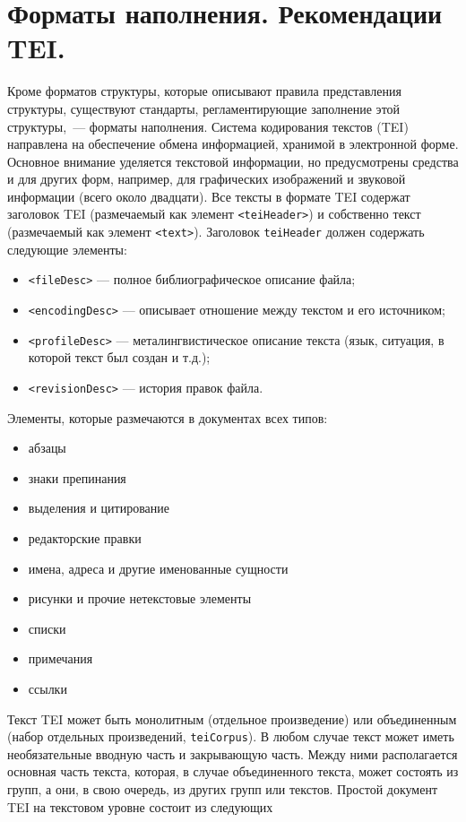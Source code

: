 \documentclass[12pt]{article}
\theoremstyle{definition}
\theoremstyle{remark}
\numberwithin{equation}{section}
\begin{document}
\section{Форматы наполнения. Рекомендации TEI.}
Кроме форматов структуры, которые описывают правила представления структуры, существуют стандарты, регламентирующие заполнение этой структуры,~--- форматы наполнения.
Система кодирования текстов (TEI) направлена на обеспечение обмена информацией, хранимой
в электронной форме. Основное внимание уделяется текстовой информации, но предусмотрены средства и для других форм, например, для графических изображений и звуковой информации (всего около двадцати). Все тексты в формате TEI содержат заголовок TEI (размечаемый как элемент \texttt{<teiHeader>}) и собственно текст (размечаемый как элемент \texttt{<text>}). Заголовок \texttt{teiHeader} должен содержать следующие элементы:
\begin{itemize}
\item \texttt{<fileDesc>} --- полное библиографическое описание файла;
\item \texttt{<encodingDesc>} --- описывает отношение между текстом и его источником;
\item \texttt{<profileDesc>} --- металингвистическое описание текста (язык, ситуация, в которой текст был создан и т.д.);
\item \texttt{<revisionDesc>} --- история правок файла.
\end{itemize}
Элементы, которые размечаются в документах всех типов:
\begin{itemize}
\item абзацы
\item знаки препинания
\item выделения и цитирование
\item редакторские правки
\item имена, адреса и другие именованные сущности
\item рисунки и прочие нетекстовые элементы
\item списки
\item примечания
\item ссылки
\end{itemize}
Текст TEI может быть монолитным (отдельное произведение) или объединенным (набор
отдельных произведений, \texttt{teiCorpus}). В любом случае текст может иметь
необязательные вводную часть и закрывающую часть. Между ними располагается основная часть
текста, которая, в случае объединенного текста, может состоять из групп, а они, в свою очередь, из других групп или текстов. Простой документ TEI на текстовом уровне состоит из следующих
\end{document}
